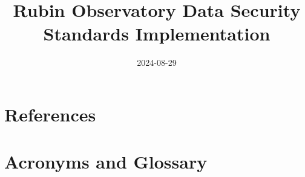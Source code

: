 \documentclass[DM,authoryear,toc]{lsstdoc}
\title{Rubin Observatory Data Security Standards Implementation}
\date{2024-08-29}
\begin{document}
\maketitle


\newpage
\appendix


\newpage
\section{References} \label{sec:bib}
\renewcommand{\refname}{} %


\section{Acronyms and Glossary} \label{sec:acronyms}
%
\printglossaries
\end{document}
